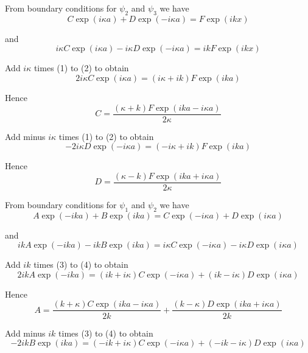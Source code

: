 From boundary conditions for $\psi_2$ and $\psi_3$ we have
\begin{equation*}
C\exp(i\kappa a)+D\exp(-i\kappa a)=F\exp(ikx)\tag{1}
\end{equation*}

and
\begin{equation*}
i\kappa C\exp(i\kappa a)-i\kappa D\exp(-i\kappa a)=ikF\exp(ikx)\tag{2}
\end{equation*}

Add $i\kappa$ times (1) to (2) to obtain
\begin{equation*}
2i\kappa C\exp(i\kappa a)=(i\kappa+ik)F\exp(ika)
\end{equation*}

Hence
\begin{equation*}
C=\frac{(\kappa+k)F\exp(ika-i\kappa a)}{2\kappa}
\end{equation*}

Add minus $i\kappa$ times (1) to (2) to obtain
\begin{equation*}
-2i\kappa D\exp(-i\kappa a)=(-i\kappa+ik)F\exp(ika)
\end{equation*}

Hence
\begin{equation*}
D=\frac{(\kappa-k)F\exp(ika+i\kappa a)}{2\kappa}
\end{equation*}

From boundary conditions for $\psi_1$ and $\psi_2$ we have
\begin{equation*}
A\exp(-ika)+B\exp(ika)=C\exp(-i\kappa a)+D\exp(i\kappa a)\tag{3}
\end{equation*}

and
\begin{equation*}
ikA\exp(-ika)-ikB\exp(ika)=i\kappa C\exp(-i\kappa a)-i\kappa D\exp(i\kappa a)\tag{4}
\end{equation*}

Add $ik$ times (3) to (4) to obtain
\begin{equation*}
2ikA\exp(-ika)=(ik+i\kappa)C\exp(-i\kappa a)+(ik-i\kappa)D\exp(i\kappa a)
\end{equation*}

Hence
\begin{equation*}
A=\frac{(k+\kappa)C\exp(ika-i\kappa a)}{2k}+\frac{(k-\kappa)D\exp(ika+i\kappa a)}{2k}
\end{equation*}

Add minus $ik$ times (3) to (4) to obtain
\begin{equation*}
-2ikB\exp(ika)=(-ik+i\kappa)C\exp(-i\kappa a)+(-ik-i\kappa)D\exp(i\kappa a)
\end{equation*}

